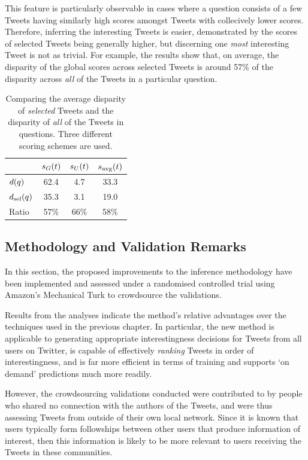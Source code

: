 This feature is particularly observable in cases where a question consists of a few Tweets having similarly high scores amongst Tweets with collecively lower scores. Therefore, inferring the interesting Tweets is easier, demonstrated by the scores of selected Tweets being generally higher, but discerning one \textit{most} interesting Tweet is not as trivial. For example, the results show that, on average, the disparity of the global scores across selected Tweets is around 57\% of the disparity across \textit{all} of the Tweets in a particular question.


\begin{table}[h]\footnotesize
\begin{center}
\begin{tabular}{ l || c | c | c }
	   & $s_G(t)$ &  $s_U(t)$ &  $s_{\textrm{avg}}(t)$\\
	 \hline
     \hline
	$d(q)$ & 62.4 & 4.7 & 33.3\\
	$d_{\textrm{sel}}(q)$ & 35.3 & 3.1 & 19.0\\
	 \hline
	Ratio & 57\% & 66\% & 58\%\\
     \hline
\end{tabular}
\end{center}
\caption{Comparing the average disparity of \textit{selected} Tweets and the disparity of \textit{all} of the Tweets in questions. Three different scoring schemes are used.}
\label{table:score-disparities-2}
\end{table}


\subsection{Methodology and Validation Remarks}
In this section, the proposed improvements to the inference methodology have been implemented and assessed under a randomised controlled trial using Amazon's Mechanical Turk to crowdsource the validations.

Results from the analyses indicate the method's relative advantages over the techniques used in the previous chapter. In particular, the new method is applicable to generating appropriate interestingness decisions for Tweets from all users on Twitter, is capable of effectively \textit{ranking} Tweets in order of interestingness, and is far more efficient in terms of training and supports `on demand' predictions much more readily.

However, the crowdsourcing validations conducted were contributed to by people who shared no connection with the authors of the Tweets, and were thus assessing Tweets from outside of their own local network. Since it is known that users typically form followships between other users that produce information of interest, then this information is likely to be more relevant to users receiving the Tweets in these communities.  

